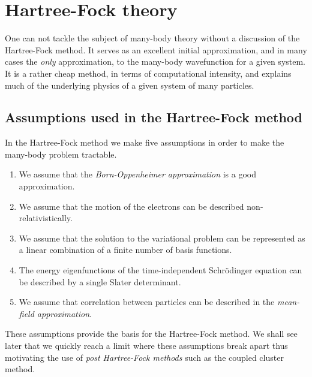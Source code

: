 \chapter{Hartree-Fock theory}
    One can not tackle the subject of many-body theory without a discussion of
    the Hartree-Fock method. It serves as an excellent initial approximation,
    and in many cases the \emph{only} approximation, to the many-body
    wavefunction for a given system. It is a rather cheap method, in terms of
    computational intensity, and explains much of the underlying physics of a
    given system of many particles.

    \section{Assumptions used in the Hartree-Fock method}
        In the Hartree-Fock method we make five assumptions in order to make the
        many-body problem tractable.
        \begin{enumerate}
            \item We assume that the \emph{Born-Oppenheimer approximation} is a
                good approximation.
            \item We assume that the motion of the electrons can be described
                non-relativistically.
            \item We assume that the solution to the variational problem can be
                represented as a linear combination of a finite number of basis
                functions.
            \item The energy eigenfunctions of the time-independent Schrödinger
                equation can be described by a single Slater determinant.
            \item We assume that correlation between particles can be described
                in the \emph{mean-field approximation}.
        \end{enumerate}
        These assumptions provide the basis for the Hartree-Fock method. We
        shall see later that we quickly reach a limit where these assumptions
        break apart thus motivating the use of \emph{post Hartree-Fock methods}
        such as the coupled cluster method.

